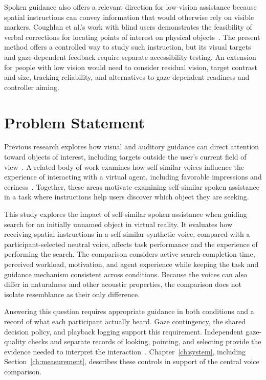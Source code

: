 Spoken guidance also offers a relevant direction for low-vision assistance because spatial instructions can convey information that would otherwise rely on visible markers. Coughlan et al.'s work with blind users demonstrates the feasibility of verbal corrections for locating points of interest on physical objects~\cite{coughlan2020spatial}. The present method offers a controlled way to study such instruction, but its visual targets and gaze-dependent feedback require separate accessibility testing. An extension for people with low vision would need to consider residual vision, target contrast and size, tracking reliability, and alternatives to gaze-dependent readiness and controller aiming.

\section{Problem Statement}
Previous research explores how visual and auditory guidance can direct attention toward objects of interest, including targets outside the user's current field of view~\cite{grogorick2017subtle,lange2020hivefive,binetti2021outofview,zhang2023seehear}. A related body of work examines how self-similar voices influence the experience of interacting with a virtual agent, including favorable impressions and eeriness~\cite{guo2024doppelganger,kao2021selfsimilar}. Together, these areas motivate examining self-similar spoken assistance in a task where instructions help users discover which object they are seeking.

This study explores the impact of self-similar spoken assistance when guiding search for an initially unnamed object in virtual reality. It evaluates how receiving spatial instructions in a self-similar synthetic voice, compared with a participant-selected neutral voice, affects task performance and the experience of performing the search. The comparison considers active search-completion time, perceived workload, motivation, and agent experience while keeping the task and guidance mechanism consistent across conditions. Because the voices can also differ in naturalness and other acoustic properties, the comparison does not isolate resemblance as their only difference.

Answering this question requires appropriate guidance in both conditions and a record of what each participant actually heard. Gaze contingency, the shared decision policy, and playback logging support this requirement. Independent gaze-quality checks and separate records of looking, pointing, and selecting provide the evidence needed to interpret the interaction~\cite{dunn2024reporting,niehorster2026dataquality}. Chapter~\ref{ch:system}, including Section~\ref{ch:measurement}, describes these controls in support of the central voice comparison.

